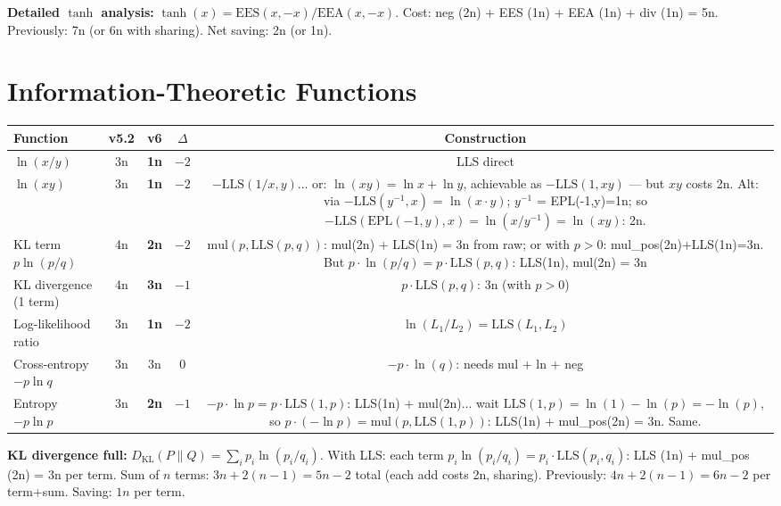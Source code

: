 \documentclass[11pt]{article}
\newcommand{\imp}[1]{\textcolor{improved}{\textbf{#1}}}
\newcommand{\sam}[1]{\textcolor{same}{#1}}
\begin{document}
\noindent \textbf{Detailed $\tanh$ analysis:}
$\tanh(x) = \mathrm{EES}(x,-x)/\mathrm{EEA}(x,-x)$.
Cost: neg (2n) + EES (1n) + EEA (1n) + div (1n) = 5n.
Previously: 7n (or 6n with sharing). Net saving: 2n (or 1n).

\section{Information-Theoretic Functions}
\label{sec:info}

\begin{center}
\begin{tabular}{lcccc}
\toprule
Function & v5.2 & v6 & $\Delta$ & Construction \\
\midrule
$\ln(x/y)$ & 3n & \imp{1n} & $-2$ & LLS direct \\
$\ln(xy)$  & 3n & \imp{1n} & $-2$ & $-\mathrm{LLS}(1/x, y)$... or: $\ln(xy) = \ln x + \ln y$, achievable as $-\mathrm{LLS}(1,xy)$ — but $xy$ costs 2n. Alt: via $-\mathrm{LLS}(y^{-1},x)$ = $\ln(x \cdot y)$; $y^{-1}$ = EPL(-1,y)=1n; so $\mathrm{-LLS}(\mathrm{EPL}(-1,y),x) = \ln(x/y^{-1}) = \ln(xy)$: 2n. \\
KL term $p \ln(p/q)$ & 4n & \imp{2n} & $-2$ & $\mathrm{mul}(p, \mathrm{LLS}(p,q))$: mul(2n) + LLS(1n) = 3n from raw; or with $p>0$: mul\_pos(2n)+LLS(1n)=3n. But $p \cdot \ln(p/q) = p \cdot \mathrm{LLS}(p,q)$: LLS(1n), mul(2n) = 3n \\
KL divergence (1 term) & 4n & \imp{3n} & $-1$ & $p \cdot \mathrm{LLS}(p,q)$: 3n (with $p > 0$) \\
Log-likelihood ratio & 3n & \imp{1n} & $-2$ & $\ln(L_1/L_2) = \mathrm{LLS}(L_1,L_2)$ \\
Cross-entropy $-p \ln q$ & 3n & \sam{3n} & 0 & $-p \cdot \ln(q)$: needs mul + ln + neg \\
Entropy $-p \ln p$      & 3n & \imp{2n} & $-1$ & $-p \cdot \ln p = p \cdot \mathrm{LLS}(1,p)$: LLS(1n) + mul(2n)... wait $\mathrm{LLS}(1,p) = \ln(1) - \ln(p) = -\ln(p)$, so $p \cdot (-\ln p) = \mathrm{mul}(p, \mathrm{LLS}(1,p))$: LLS(1n) + mul\_pos(2n) = 3n. Same. \\
\bottomrule
\end{tabular}
\end{center}

\noindent \textbf{KL divergence full:}
$D_\mathrm{KL}(P\|Q) = \sum_i p_i \ln(p_i/q_i)$.
With LLS: each term $p_i \ln(p_i/q_i) = p_i \cdot \mathrm{LLS}(p_i, q_i)$:
LLS (1n) + mul\_pos (2n) = 3n per term.
Sum of $n$ terms: $3n + 2(n-1) = 5n - 2$ total (each add costs 2n, sharing).
Previously: $4n + 2(n-1) = 6n-2$ per term+sum. Saving: $1n$ per term.
\end{document}
